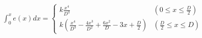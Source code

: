 \documentclass[
  11pt,
  border=2,
  convert={
    density=100 -alpha remove,
    outext=.png
  },
]{standalone}
\begin{document}
$
  \displaystyle \int_0^x e(x) dx = \begin{cases}
    \displaystyle k\frac{x^4}{D^3} 
      & \left(0 \leq x \leq \frac{D}{2}\right)
    \\
    \displaystyle k\left( \frac{x^4}{D^3} - \frac{4x^3}{D^2} + \frac{6x^2}{D} - 3x + \frac{D}{2} \right) 
      & \left(\frac{D}{2} \leq x \leq D\right)
  \end{cases}
$
\end{document}
